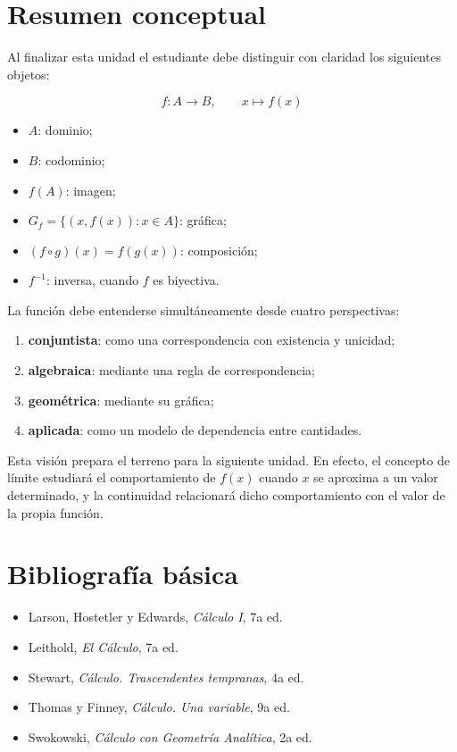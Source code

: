 \documentclass[12pt]{article}
\theoremstyle{remark}
\begin{document}
\section{Resumen conceptual}

Al finalizar esta unidad el estudiante debe distinguir con claridad los
siguientes objetos:

\[
\boxed{
f:A\to B,\qquad x\mapsto f(x)
}
\]

\begin{itemize}
    \item $A$: dominio;
    \item $B$: codominio;
    \item $f(A)$: imagen;
    \item $G_f=\{(x,f(x)):x\in A\}$: gráfica;
    \item $(f\circ g)(x)=f(g(x))$: composición;
    \item $f^{-1}$: inversa, cuando $f$ es biyectiva.
\end{itemize}

La función debe entenderse simultáneamente desde cuatro perspectivas:
\begin{enumerate}
    \item \textbf{conjuntista}: como una correspondencia con existencia y
    unicidad;
    \item \textbf{algebraica}: mediante una regla de correspondencia;
    \item \textbf{geométrica}: mediante su gráfica;
    \item \textbf{aplicada}: como un modelo de dependencia entre cantidades.
\end{enumerate}

Esta visión prepara el terreno para la siguiente unidad. En efecto, el concepto
de límite estudiará el comportamiento de $f(x)$ cuando $x$ se aproxima a un
valor determinado, y la continuidad relacionará dicho comportamiento con el
valor de la propia función.

\section*{Bibliografía básica}

\begin{itemize}
    \item Larson, Hostetler y Edwards, \emph{Cálculo I}, 7a ed.
    \item Leithold, \emph{El Cálculo}, 7a ed.
    \item Stewart, \emph{Cálculo. Trascendentes tempranas}, 4a ed.
    \item Thomas y Finney, \emph{Cálculo. Una variable}, 9a ed.
    \item Swokowski, \emph{Cálculo con Geometría Analítica}, 2a ed.
\end{itemize}
\end{document}
